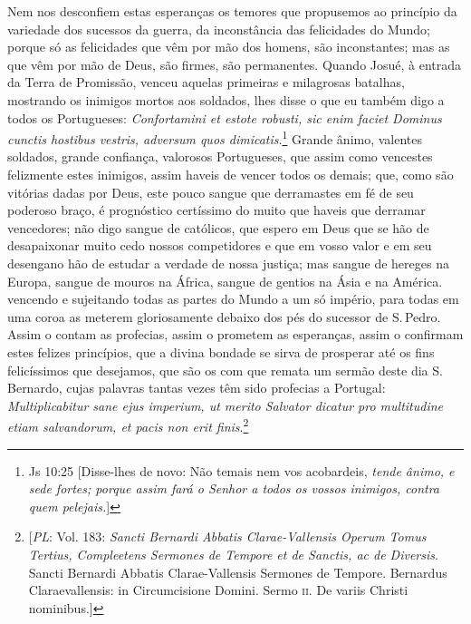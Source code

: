 Nem nos desconfiem estas esperanças os temores que propusemos ao
princípio da variedade dos sucessos da guerra, da inconstância das
felicidades do Mundo; porque só as felicidades que vêm por mão dos
homens, são inconstantes; mas as que vêm por mão de Deus, são firmes,
são permanentes. Quando Josué, à entrada da Terra de Promissão, venceu
aquelas primeiras e milagrosas batalhas, mostrando os inimigos mortos
aos soldados, lhes disse o que eu também digo a todos os Portugueses:
\emph{Confortamini et estote robusti, sic enim faciet Dominus cunctis
hostibus vestris, adversum quos dimicatis}.\footnote{Js 10:25 [Disse-lhes de novo: Não temais nem vos acobardeis, \textit{tende ânimo, e sede fortes; porque assim fará o Senhor a todos os vossos inimigos, contra quem pelejais.}]} Grande ânimo, valentes
soldados, grande confiança, valorosos Portugueses, que assim como
vencestes felizmente estes inimigos, assim haveis de vencer todos os
demais; que, como são vitórias dadas por Deus, este pouco sangue que
derramastes em fé de seu poderoso braço, é prognóstico certíssimo do
muito que haveis que derramar vencedores; não digo sangue de católicos,
que espero em Deus que se hão de desapaixonar muito cedo nossos
competidores e que em vosso valor e em seu desengano hão de estudar a
verdade de nossa justiça; mas sangue de hereges na Europa, sangue de
mouros na África, sangue de gentios na Ásia e na América. vencendo e
sujeitando todas as partes do Mundo a um só império, para todas em uma
coroa as meterem gloriosamente debaixo dos pés do sucessor de S.\,Pedro.
Assim o contam as profecias, assim o prometem as esperanças, assim o
confirmam estes felizes princípios, que a divina bondade se sirva de
prosperar até os fins felicíssimos que desejamos, que são os com que
remata um sermão deste dia S.\,Bernardo, cujas palavras tantas vezes têm
sido profecias a Portugal: \emph{Multiplicabitur sane ejus imperium, ut
merito Salvator dicatur pro multitudine etiam salvandorum, et pacis non
erit finis}.\footnote{[\textit{PL}: Vol. 183: \textit{Sancti Bernardi Abbatis Clarae-Vallensis Operum Tomus Tertius, Compleetens Sermones de Tempore et de Sanctis, ac de Diversis}. Sancti Bernardi Abbatis Clarae-Vallensis Sermones de Tempore. Bernardus Claraevallensis: in Circumcisione Domini. Sermo \textsc{ii}. De variis Christi nominibus.]}


